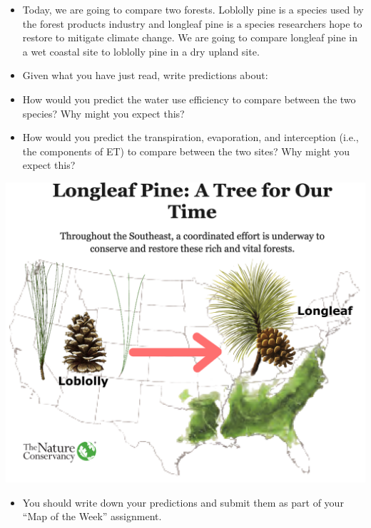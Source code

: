 \documentclass[oneside,a4paper,11pt,explicit]{book}
\begin{document}
\begin{tcolorbox}[colback=yellow!5!white,colframe=IceCreamLeaf,title=\textbf{Hypotheses}]
	\begin{multicols}{2}
	
	\begin{itemize}
		\item Today, we are going to compare two forests. Loblolly pine is a species used by the forest products industry and longleaf pine is a species researchers hope to restore to mitigate climate change. We are going to compare longleaf pine in a wet coastal site to loblolly pine in a dry upland site.
		\item Given what you have just read, write predictions about: 
            \item[1)] How would you predict the water use efficiency to compare between the two species? Why might you expect this? 
            \item[2)] How would you predict the transpiration, evaporation, and interception (i.e., the components of ET) to compare between the two sites? Why might you expect this? 
	\end{itemize}

 
	\columnbreak

	\centerline{\includegraphics[width=\columnwidth]{SouthernPineIntro.png}}

	\begin{itemize}
              \item You should write down your predictions and submit them as part of your ``Map of the Week'' assignment.
	\end{itemize}

	\end{multicols}
\end{tcolorbox}
\end{document}

